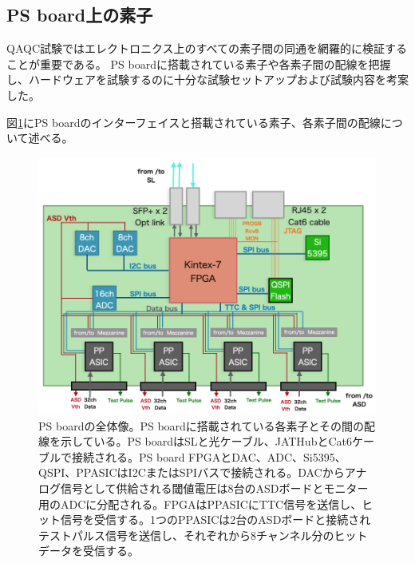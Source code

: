 \newpage
\subsection{PS board上の素子}
\label{subsec_PSBelements}
QAQC試験ではエレクトロニクス上のすべての素子間の同通を網羅的に検証することが重要である。
PS boardに搭載されている素子や各素子間の配線を把握し、ハードウェアを試験するのに十分な試験セットアップおよび試験内容を考案した。

図\ref{PSBconcept}にPS boardのインターフェイスと搭載されている素子、各素子間の配線について述べる。

\begin{figure} 
\centering
\includegraphics[width=16cm]{fig/QAQC/PSBoverall.png}
\caption[PSboardの全体像]{PS boardの全体像。PS boardに搭載されている各素子とその間の配線を示している。PS boardはSLと光ケーブル、JATHubとCat6ケーブルで接続される。PS board FPGAとDAC、ADC、Si5395、QSPI、PPASICはI2CまたはSPIバスで接続される。DACからアナログ信号として供給される閾値電圧は8台のASDボードとモニター用のADCに分配される。FPGAはPPASICにTTC信号を送信し、ヒット信号を受信する。1つのPPASICは2台のASDボードと接続されテストパルス信号を送信し、それぞれから8チャンネル分のヒットデータを受信する。}
\label{PSBconcept}
\end{figure}

\baselineskip

